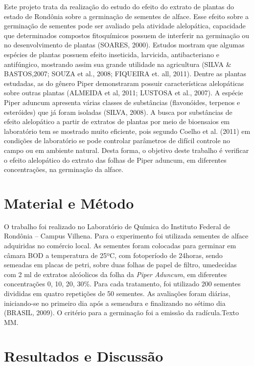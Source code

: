 \documentclass[article,12pt,onesidea,4paper,english,brazil]{abntex2}
\begin{document}
	Este projeto trata da realização do estudo do efeito do extrato de plantas do estado de Rondônia sobre a germinação de sementes de alface. Esse efeito sobre a germinação de sementes pode ser avaliado pela atividade alelopática, capacidade que determinados compostos fitoquímicos possuem de interferir na germinação ou no desenvolvimento de plantas (SOARES, 2000).
	Estudos mostram que algumas espécies de plantas possuem efeito inseticida, larvicida, antibacteriano e antifúngico, mostrando assim sua grande utilidade na agricultura (SILVA \& BASTOS,2007; SOUZA et al., 2008; FIQUEIRA et. all, 2011).
	Dentre as plantas estudadas, as do gênero Piper demonstraram possuir características alelopáticas sobre outras plantas (ALMEIDA et al, 2011; LUSTOSA et al., 2007). A espécie Piper aduncum apresenta várias classes de substâncias (flavonóides, terpenos e esteróides) que já foram isoladas (SILVA, 2008). A busca por substâncias de efeito alelopático a partir de extratos de plantas por meio de bioensaios em laboratório tem se mostrado muito eficiente, pois segundo Coelho et al. (2011) em condições de laboratório se pode controlar parâmetros de difícil controle no campo ou em ambiente natural.
	Desta forma, o objetivo deste trabalho é verificar o efeito alelopático do extrato das folhas de Piper aduncum, em diferentes concentrações, na germinação da alface.
	
	\section*{Material e Método}
	
	O trabalho foi realizado no Laboratório de Química do Instituto Federal de Rondônia – Campus Vilhena. Para o experimento foi utilizada sementes de alface adquiridas no comércio local. As sementes foram colocadas para germinar em câmara BOD a temperatura de 25ºC, com fotoperíodo de 24horas, sendo semeadas em placas de petri, sobre duas folhas de papel de filtro, umedecidas com 2 ml de extratos alcóolicos da folha da \textit{Piper Aduncum}, em diferentes concentrações 0, 10, 20, 30\%. Para cada tratamento, foi utilizado 200 sementes divididas em quatro repetições de 50 sementes.
	As avaliações foram diárias, iniciando-se no primeiro dia após a semeadura e finalizando no sétimo dia (BRASIL, 2009). O critério para a germinação foi a emissão da radícula.Texto MM.
	
	\section*{Resultados e Discussão}
	
\end{document}
